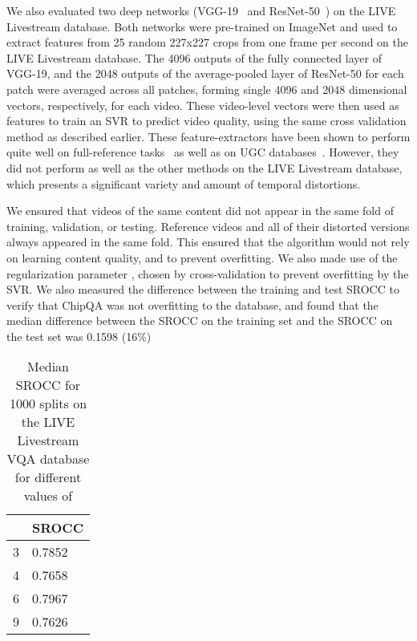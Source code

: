 \documentclass[journal]{IEEEtran}
\begin{document}
We also evaluated two deep networks (VGG-19~\cite{vgg19} and ResNet-50~\cite{resnet}) on the LIVE Livestream database. Both networks were pre-trained on ImageNet and used to extract features from 25 random 227x227 crops from one frame per second on the LIVE Livestream database. The 4096 outputs of the fully connected layer of VGG-19, and the 2048 outputs of the average-pooled layer of ResNet-50 for each patch were averaged across all patches, forming  single 4096 and 2048 dimensional vectors, respectively, for each video. These video-level vectors were then used as features to train an SVR to predict video quality, using the same cross validation method as described earlier. These feature-extractors have been shown to perform quite well on full-reference tasks~\cite{lpips} as well as on UGC databases~\cite{videval}. However, they did not perform as well as the other methods on the LIVE Livestream database, which presents a significant variety and amount of temporal distortions. 

We ensured that videos of the same content did not appear in the same fold of training, validation, or testing. Reference videos and all of their distorted versions always appeared in the same fold. This ensured that the algorithm would not rely on learning  content quality, and to prevent overfitting. We also made use of the regularization parameter , chosen by cross-validation to prevent overfitting by the SVR. We also measured the difference between the training and test SROCC to verify that ChipQA was not overfitting to the database, and found that the median difference between the SROCC on the training set and the SROCC on the test set was 0.1598 (16\%)

\begin{table}
\caption{Median SROCC for 1000 splits on the LIVE Livestream VQA database for different values of }
\begin{center}
\begin{tabular}{|l|l|}
\hline
  & SROCC \\
\hline
3  & 0.7852  \\
\hline
4  & 0.7658 \\
\hline
6  & 0.7967 \\
\hline
9 & 0.7626  \\
\hline
\end{tabular}
\label{tab:qparam}
\end{center}
\vspace{-5mm}
\end{table}
\end{document}
